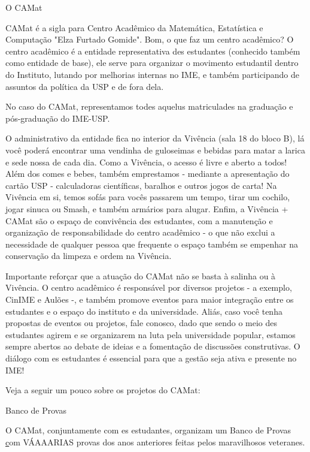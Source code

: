 \begin{secao}{O CAMat}

CAMat é a sigla para Centro Acadêmico da Matemática, Estatística e Computação 
"Elza Furtado Gomide". Bom, o que faz um centro acadêmico? 
O centro acadêmico é a entidade representativa des estudantes (conhecido 
também como entidade de base), ele serve para organizar o movimento estudantil
dentro do Instituto, lutando por melhorias internas no IME, e também
participando de assuntos da política da USP e de fora dela.

No caso do CAMat, representamos todes aquelus matriculades na graduação e pós-graduação do IME-USP.

O administrativo da entidade fica no interior da Vivência (sala 18 do bloco B), lá você 
poderá encontrar uma vendinha de guloseimas e bebidas para matar a larica e sede nossa de
cada dia. Como a Vivência,  o acesso é livre e aberto a todos! Além dos
comes e bebes, também emprestamos - mediante a apresentação do cartão USP -
calculadoras científicas, baralhos e outros jogos de carta! Na Vivência em si, temos sofás
para vocês passarem um tempo, tirar um cochilo, jogar sinuca ou Smash, e
também armários para alugar. Enfim, a Vivência + CAMat são o espaço de convivência 
des estudantes, com a manutenção e organização de responsabilidade do centro acadêmico 
- o que não exclui a necessidade de qualquer pessoa que frequente o espaço também se 
empenhar na conservação da limpeza e ordem na Vivência.

Importante reforçar que a atuação do CAMat não se basta à salinha ou à Vivência. 
O centro acadêmico é responsável por diversos projetos - a exemplo, CinIME e Aulões 
-, e também promove eventos para maior integração entre os estudantes e o espaço do 
instituto e da universidade. Aliás, caso você tenha propostas de eventos ou projetos, 
fale conosco, dado que sendo o meio des estudantes agirem e se organizarem na luta pela 
universidade popular, estamos sempre abertos ao debate de ideias e a fomentação de discussões 
construtivas. O diálogo com es estudantes é essencial para que a gestão seja ativa e presente no IME!

Veja a seguir um pouco sobre os projetos do CAMat:


\begin{subsecao}{Banco de Provas}

O CAMat, conjuntamente com es estudantes, organizam um Banco de Provas
\href{https://camat.ime.usp.br/apoio/} com VÁAAARIAS provas dos anos 
anteriores feitas pelos maravilhosos veteranes.


\end{subsecao}
\end{secao}
